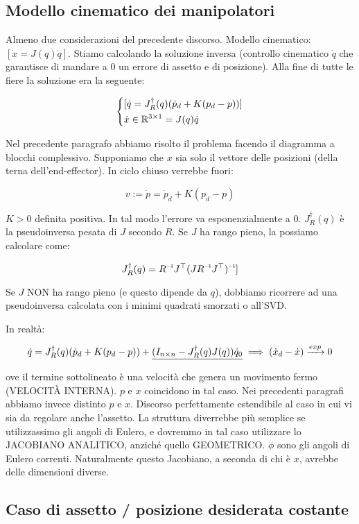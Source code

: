 \subsection{Modello cinematico dei manipolatori}

Almeno due considerazioni del precedente discorso. Modello cinematico: $[\dot{x}=J(q)\dot{q}]$. Stiamo calcolando la soluzione inversa (controllo cinematico $\dot{q}$ che garantisce di mandare a 0 un errore di assetto e di posizione). Alla fine di tutte le fiere la soluzione era la seguente:

\[
	\left\{
	\begin{aligned}
	&[\dot{q}=J^\dag_R(q)(\dot{p}_d + K(p_d-p))]\\
	&\dot{x}\in\mathbb{R}^{3\times 1}=J(q)\dot{q}
	\end{aligned}
	\right.
\]

Nel precedente paragrafo abbiamo risolto il problema facendo il diagramma a blocchi complessivo. Supponiamo che $x$ sia solo il vettore delle posizioni (della terna dell'end-effector). In ciclo chiuso verrebbe fuori:

\[
	v := \dot{p} = \dot{p}_d + K(p_d-p)
\]

$K>0$ definita positiva. In tal modo l'errore va esponenzialmente a 0. $J^\dag_R(q)$ è la pseudoinversa pesata di $J$ secondo $R$. Se $J$ ha rango pieno, la possiamo calcolare come:

\[
	J^\dag_R(q) = \inv{R}J^\top\inv{(J\inv{R}J^\top)}]
\]

Se $J$ NON ha rango pieno (e questo dipende da $q$), dobbiamo ricorrere ad una pseudoinversa calcolata con i minimi quadrati smorzati o all'SVD.

In realtà:

\[
	\dot{q} = J^\dag_R(q)(\dot{p}_d+K(p_d-p)) + \underline{(I_{n\times n} - J^\dag_R(q)J(q))\dot{q}_0} \implies (\dot{x}_d-\dot{x})\tendsto{exp}0
\]

ove il termine sottolineato è una velocità che genera un movimento fermo (VELOCIT\`A INTERNA). $p$ e $x$ coincidono in tal caso. Nei precedenti paragrafi abbiamo invece distinto $p$ e $x$. Discorso perfettamente estendibile al caso in cui vi sia da regolare anche l'assetto. La struttura diverrebbe più semplice se utilizzassimo gli angoli di Eulero, e dovremmo in tal caso utilizzare lo JACOBIANO ANALITICO, anziché quello GEOMETRICO. $\phi$ sono gli angoli di Eulero correnti. Naturalmente questo Jacobiano, a seconda di chi è $x$, avrebbe delle dimensioni diverse.

\subsection{Caso di assetto / posizione desiderata costante}

